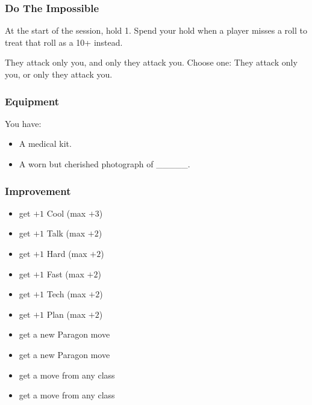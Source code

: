 \subsubsection{Do The Impossible}
At the start of the session, hold 1.
Spend your hold when a player misses a roll to treat that roll as a 10+ instead.


{They attack only you, and only they attack you.}
{Choose one: They attack only you, or only they attack you.}


\subsubsection{Equipment}
You have:
\begin{itemize}
\item A medical kit.
\item A worn but cherished photograph of \_\_\_\_\_.
\end{itemize}

\subsubsection{Improvement}
\begin{itemize}
\item get $+1$ Cool (max $+3$)
\item get $+1$ Talk (max $+2$)
\item get $+1$ Hard (max $+2$)
\item get $+1$ Fast (max $+2$)
\item get $+1$ Tech (max $+2$)
\item get $+1$ Plan (max $+2$)
\item get a new Paragon move
\item get a new Paragon move
\item get a move from any class
\item get a move from any class
\end{itemize}